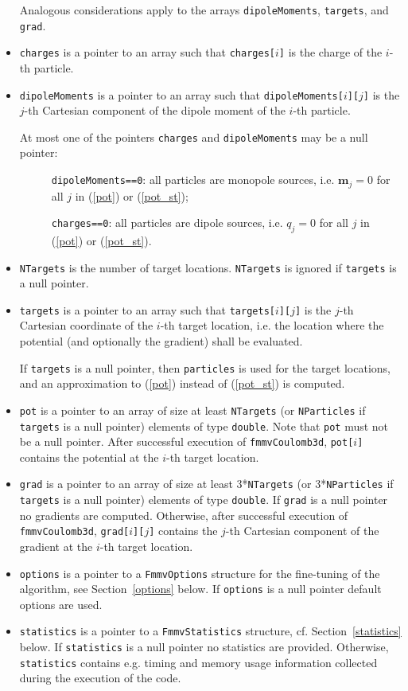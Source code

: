 \begin{itemize}
	Analogous considerations apply to the arrays
	\verb|dipoleMoments|, \verb|targets|, and \verb|grad|.
\item {\verb|charges|} is a pointer to an array such that 
	\verb|charges[|$i$\verb|]| is the charge of the $i$-th particle.
\item {\verb|dipoleMoments|} is a pointer to an array such that 
	\verb|dipoleMoments[|$i$\verb|][|$j$\verb|]| is the $j$-th Cartesian
	 component of the dipole moment of the $i$-th particle.

	At most one of the pointers \verb|charges| and 
	\verb|dipoleMoments| may be a null pointer:
	\begin{description}
	\item[] \verb|dipoleMoments==0|: all particles are monopole sources, i.e. $\mathbf{m}_j=0$ for all
	$j$ in (\ref{pot}) or (\ref{pot_st});
	\item[] \verb|charges==0|: all particles are dipole sources, i.e. $q_j=0$ for all
	$j$ in (\ref{pot}) or (\ref{pot_st}).
	\end{description}
\item {\verb|NTargets|} is the number of target locations. \verb|NTargets| is ignored if
	\verb|targets| is a null pointer.
\item {\verb|targets|} is a pointer to an array such that \verb|targets[|$i$\verb|][|$j$\verb|]| 
	is the $j$-th Cartesian coordinate of the $i$-th target location, i.e. the location
	where the potential (and optionally the gradient) shall be evaluated.

	If \verb|targets| is a null pointer, then \verb|particles| is used for the target locations,
	and an approximation to (\ref{pot}) instead of (\ref{pot_st}) is computed.
\item {\verb|pot|} is a pointer to an array of size at least \verb|NTargets| (or  \verb|NParticles| if
	\verb|targets| is a null pointer) elements of type \verb|double|.
	Note that \verb|pot| must not be a null pointer.
	After successful execution of \verb|fmmvCoulomb3d|, \verb|pot[|$i$\verb|]| contains
	the potential at the $i$-th target location.
\item {\verb|grad|} is a pointer to an array of size at least 3*\verb|NTargets| (or  3*\verb|NParticles| if
	\verb|targets| is a null pointer) elements of type \verb|double|.
	If \verb|grad| is a null pointer no gradients are computed. Otherwise, after successful execution of \verb|fmmvCoulomb3d|, \verb|grad[|$i$\verb|][|$j$\verb|]| contains the $j$-th Cartesian
	 component of the gradient at the $i$-th target location.
\item {\verb|options|} is a pointer to a \verb|FmmvOptions| structure for the fine-tuning
	of the algorithm, see Section~\ref{options} below.
	If \verb|options| is a null pointer default options are used.
\item {\verb|statistics|} is a pointer to a \verb|FmmvStatistics| structure, cf. 
	Section~\ref{statistics} below.
	If \verb|statistics| is a null pointer no statistics are provided. Otherwise, \verb|statistics|
	contains e.g. timing and memory usage information collected during the execution of the code.

\end{itemize}
